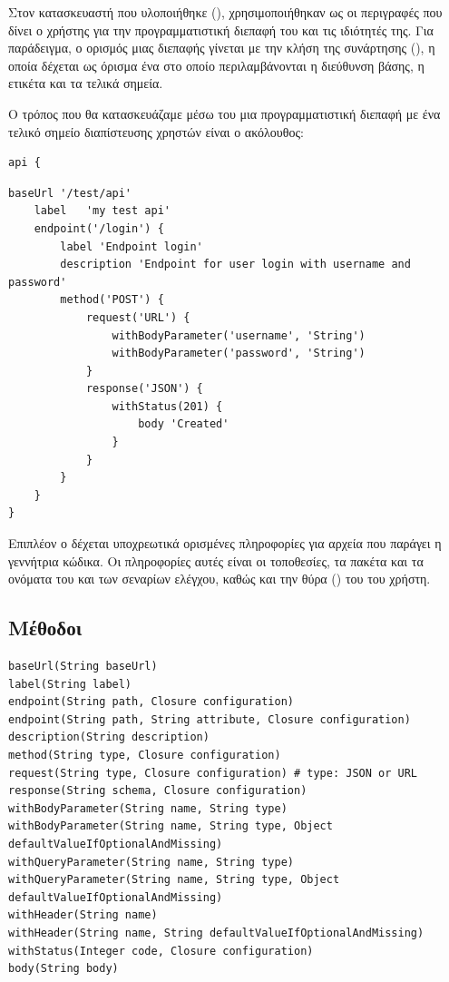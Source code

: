 Στον  κατασκευαστή που υλοποιήθηκε (),
χρησιμοποιήθηκαν ως  οι περιγραφές που δίνει ο χρήστης για την προγραμματιστική διεπαφή του και τις ιδιότητές της.
Για παράδειγμα, 
ο ορισμός μιας διεπαφής γίνεται με την κλήση της συνάρτησης (),
η οποία δέχεται ως όρισμα ένα  στο οποίο περιλαμβάνονται 
η διεύθυνση βάσης, η ετικέτα και τα τελικά σημεία.

Ο τρόπος που θα κατασκευάζαμε μέσω του  μια προγραμματιστική διεπαφή 
με ένα τελικό σημείο διαπίστευσης χρηστών είναι ο ακόλουθος:


\begin{lstlisting}
api {
\end{lstlisting}
\begin{lstlisting}[deletekeywords={api}]
    baseUrl '/test/api'
    label   'my test api'
    endpoint('/login') {
        label 'Endpoint login'
        description 'Endpoint for user login with username and password'
        method('POST') {
            request('URL') {
                withBodyParameter('username', 'String')
                withBodyParameter('password', 'String')
            }
            response('JSON') {
                withStatus(201) {
                    body 'Created'
                }
            }
        }
    }
}
\end{lstlisting}


Επιπλέον ο  δέχεται υποχρεωτικά ορισμένες πληροφορίες για αρχεία που παράγει η γεννήτρια κώδικα.
Οι πληροφορίες αυτές είναι οι τοποθεσίες, τα πακέτα και τα ονόματα 
του  και των σεναρίων ελέγχου,
καθώς και την θύρα () του  του χρήστη.

\subsection{Μέθοδοι}


\begin{lstlisting}
baseUrl(String baseUrl) 
label(String label)
endpoint(String path, Closure configuration)
endpoint(String path, String attribute, Closure configuration)
description(String description)
method(String type, Closure configuration)
request(String type, Closure configuration) # type: JSON or URL
response(String schema, Closure configuration)
withBodyParameter(String name, String type)
withBodyParameter(String name, String type, Object defaultValueIfOptionalAndMissing)
withQueryParameter(String name, String type)
withQueryParameter(String name, String type, Object defaultValueIfOptionalAndMissing)
withHeader(String name)
withHeader(String name, String defaultValueIfOptionalAndMissing)
withStatus(Integer code, Closure configuration)
body(String body)
\end{lstlisting}

